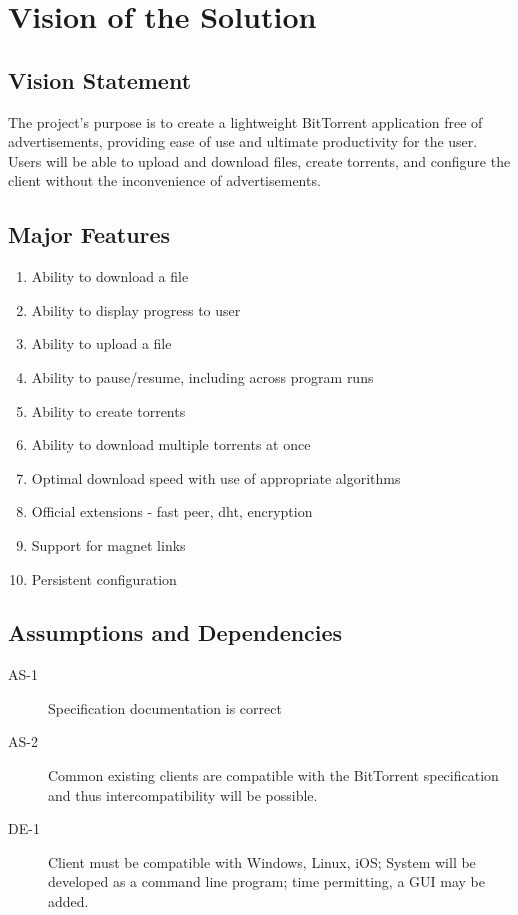 \documentclass[letter]{scrartcl}
\begin{document}
\section{Vision of the Solution}
\subsection{Vision Statement}
The project's purpose is to create a lightweight BitTorrent application free of advertisements, providing ease of use and ultimate productivity for the user.  Users will be able to upload and download files, create torrents, and configure the client without the inconvenience of advertisements.
\subsection{Major Features}
\begin{enumerate}
\item Ability to download a file
\item Ability to display progress to user
\item Ability to upload a file
\item Ability to pause/resume, including across program runs
\item Ability to create torrents
\item Ability to download multiple torrents at once
\item Optimal download speed with use of appropriate algorithms
\item Official extensions - fast peer, dht, encryption
\item Support for magnet links
\item Persistent configuration
\end{enumerate}

\subsection{Assumptions and Dependencies}
\begin{description}
\item[AS-1] Specification documentation is correct
\item[AS-2] Common existing clients are compatible with the BitTorrent specification and thus intercompatibility will be possible.
\item[DE-1] Client must be compatible with Windows, Linux, iOS;
System will be developed as a command line program; time permitting, a GUI may be added.
\end{description}
\end{document}

